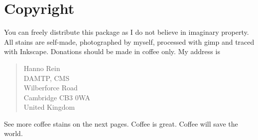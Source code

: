 \documentclass{article}
\begin{document}
\section{Copyright}
You can freely distribute this package as I do not believe in imaginary property. All stains are self-made, photographed by myself, processed with gimp and traced with Inkscape.
Donations should be made in coffee only. My address is
\begin{quote}
Hanno Rein\\
DAMTP, CMS\\
Wilberforce Road\\
Cambridge CB3 0WA\\
United Kingdom
\end{quote}
See more coffee stains on the next pages.
\newpage
{}
Coffee is great.
\newpage
{}
Coffee will save the world. 
\end{document}
